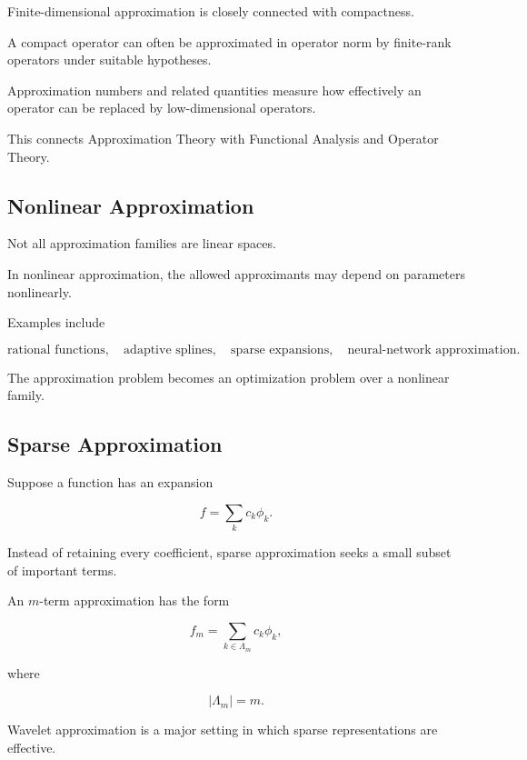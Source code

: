 Finite-dimensional approximation is closely connected with compactness.

A compact operator can often be approximated in operator norm by
finite-rank operators under suitable hypotheses.

Approximation numbers and related quantities measure how effectively an
operator can be replaced by low-dimensional operators.

This connects Approximation Theory with Functional Analysis and Operator
Theory.

\subsection{Nonlinear Approximation}
\label{subsec:nonlinear-approximation}

Not all approximation families are linear spaces.

In nonlinear approximation, the allowed approximants may depend on
parameters nonlinearly.

Examples include

\[
\boxed{
\text{rational functions},
\quad
\text{adaptive splines},
\quad
\text{sparse expansions},
\quad
\text{neural-network approximation}.
}
\]

The approximation problem becomes an optimization problem over a
nonlinear family.

\subsection{Sparse Approximation}
\label{subsec:sparse-approximation}

Suppose a function has an expansion

\[
f
=
\sum_{k}
c_k\phi_k.
\]

Instead of retaining every coefficient, sparse approximation seeks a
small subset of important terms.

An \(m\)-term approximation has the form

\[
\boxed{
f_m
=
\sum_{k\in\Lambda_m}
c_k\phi_k,
}
\]

where

\[
|\Lambda_m|=m.
\]

Wavelet approximation is a major setting in which sparse representations
are effective.

